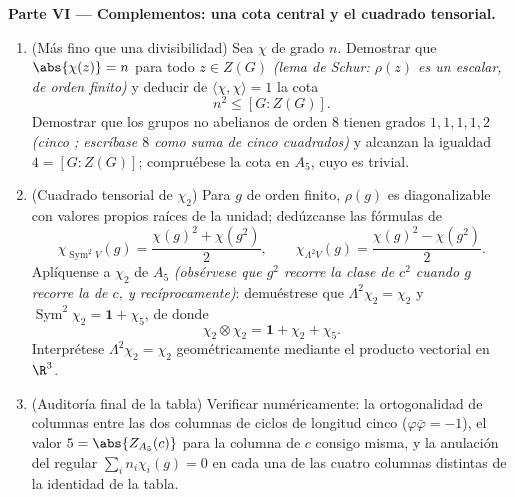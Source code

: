 \begin{problem}
\medskip
\noindent\textbf{Parte VI --- Complementos: una cota central y el
cuadrado tensorial.}
\begin{enumerate}[resume]
  \item (Más fino que una divisibilidad) Sea $\chi$
   de grado $n$.
  Demostrar que $\abs{\chi(z)} = n$ para todo $z \in Z(G)$ \emph{(lema
  de Schur: $\rho(z)$ es un escalar, de orden finito)} y deducir de
  $\langle\chi, \chi\rangle = 1$ la cota
        \[
        n^2 \leq [G : Z(G)] .
        \]
        Demostrar que los grupos no abelianos de orden $8$ tienen grados
        $1, 1, 1, 1, 2$ \emph{(cinco
        ; escríbase
        $8$ como suma de cinco cuadrados)} y alcanzan la igualdad
        $4 = [G : Z(G)]$; compruébese la cota en $A_5$, cuyo
         es trivial. \item
        (Cuadrado tensorial de $\chi_2$) Para $g$ de orden finito,
        $\rho(g)$ es diagonalizable con valores propios raíces de la
        unidad; dedúzcanse las fórmulas de
        \[
        \chi_{\operatorname{Sym}^2 V}(g)
        = \frac{\chi(g)^2 + \chi(g^2)}2,
        \qquad
        \chi_{\Lambda^2 V}(g)
        = \frac{\chi(g)^2 - \chi(g^2)}2 .
        \]
        Aplíquense a $\chi_2$ de $A_5$ \emph{(obsérvese que $g^2$
        recorre la clase de $c^2$ cuando $g$ recorre la de $c$, y
        recíprocamente)}: demuéstrese que $\Lambda^2\chi_2 =
        \chi_2$ y $\operatorname{Sym}^2\chi_2 = \mathbf 1 +
        \chi_5$, de donde
        \[
        \chi_2\otimes\chi_2 = \mathbf 1 + \chi_2 + \chi_5 .
        \]
        Interprétese $\Lambda^2\chi_2 = \chi_2$ geométricamente mediante
        el producto vectorial en $\R^3$. \item (Auditoría final de la
        tabla) Verificar numéricamente: la ortogonalidad de columnas
        entre las dos columnas de ciclos de longitud cinco
        ($\varphi\bar\varphi = -1$), el valor $5 =
        \abs{Z_{A_5}(c)}$ para la columna de $c$ consigo misma, y la
        anulación del
         regular
        $\sum_i
        n_i\chi_i(g) = 0$ en cada una de las cuatro columnas distintas
        de la identidad de la tabla.
\end{enumerate}
\end{problem}

